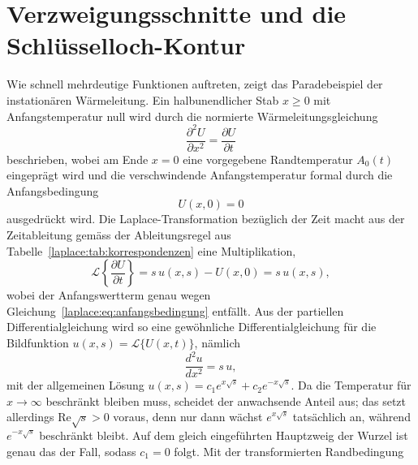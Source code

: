%
%
\section{Verzweigungsschnitte und die Schlüsselloch-Kontur}
\label{laplace:subsection:verzweigung}
%

Wie schnell mehrdeutige Funktionen auftreten, zeigt das Paradebeispiel der
instationären Wärmeleitung.
Ein halbunendlicher Stab $x \geq 0$ mit Anfangstemperatur null wird durch
die normierte Wärmeleitungsgleichung
\begin{equation}
    \frac{\partial^2 U}{\partial x^2}
    =
    \frac{\partial U}{\partial t}
    \label{laplace:eq:waermeleitung}
\end{equation}
beschrieben, wobei am Ende $x = 0$ eine vorgegebene Randtemperatur
$A_0(t)$ eingeprägt wird und die verschwindende Anfangstemperatur formal
durch die Anfangsbedingung
\begin{equation}
    U(x, 0)
    =
    0
    \label{laplace:eq:anfangsbedingung}
\end{equation}
ausgedrückt wird.
Die Laplace-Transformation bezüglich der Zeit macht aus der Zeitableitung
gemäss der Ableitungsregel aus
Tabelle~\ref{laplace:tab:korrespondenzen} eine Multiplikation,
\begin{equation}
    \mathcal{L}\left\{\frac{\partial U}{\partial t}\right\}
    =
    s \, u(x,s) - U(x,0)
    =
    s \, u(x,s),
    \label{laplace:eq:ableitungsregel}
\end{equation}
wobei der Anfangswertterm genau wegen
Gleichung~\eqref{laplace:eq:anfangsbedingung} entfällt.
Aus der partiellen Differentialgleichung wird so eine gewöhnliche
Differentialgleichung für die Bildfunktion
$u(x,s) = \mathcal{L}\{U(x,t)\}$, nämlich
\begin{equation}
    \frac{d^2 u}{d x^2}
    =
    s \, u,
    \label{laplace:eq:bildgleichung}
\end{equation}
mit der allgemeinen Lösung
$u(x,s) = c_1 e^{x\sqrt{s}} + c_2 e^{-x\sqrt{s}}$.
Da die Temperatur für $x \to \infty$ beschränkt bleiben muss, scheidet der
anwachsende Anteil aus; das setzt allerdings $\text{Re}\sqrt{s} > 0$
voraus, denn nur dann wächst $e^{x\sqrt{s}}$ tatsächlich an, während
$e^{-x\sqrt{s}}$ beschränkt bleibt.
Auf dem gleich eingeführten Hauptzweig der Wurzel ist genau das der Fall,
sodass $c_1 = 0$ folgt.
Mit der transformierten Randbedingung
